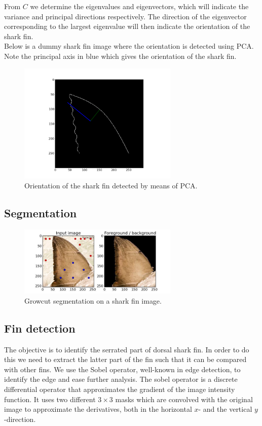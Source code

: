 \documentclass[a4paper,10pt]{article}
\begin{document}
From $C$ we determine the eigenvalues and eigenvectors, which will indicate the variance and principal directions respectively.
The direction of the eigenvector corresponding to the largest eigenvalue will then indicate the orientation of the shark fin. \\
 
Below is a dummy shark fin image where the orientation is detected using PCA.  Note the principal axis in blue which gives the orientation of the shark fin.

\begin{figure}[H]
 \centering
 \includegraphics[width=3in]{orientation.jpg}
 \caption{Orientation of the shark fin detected by means of PCA.}
 \label{orientation}
\end{figure}

\subsection{Segmentation}

\begin{figure}[H]
 \centering
 \includegraphics[width=3in]{segmentation.jpg}
 \caption{Growcut segmentation on a shark fin image.}
 \label{segmentation}
\end{figure}

\subsection{Fin detection}
The objective is to identify the serrated part of dorsal shark fin. In order to do this we need to extract the latter part of the fin such that it can be
compared with other fins.  We use the Sobel operator, well-known in edge detection, to identify the edge and ease further analysis.  
The sobel operator is a discrete differential operator that approximates the gradient of the image intensity function.
It uses two different $3 \times 3$ masks which are convolved with the original image to approximate the derivatives, both in the horizontal $x$-
and the vertical $y$-direction.  
\end{document}
